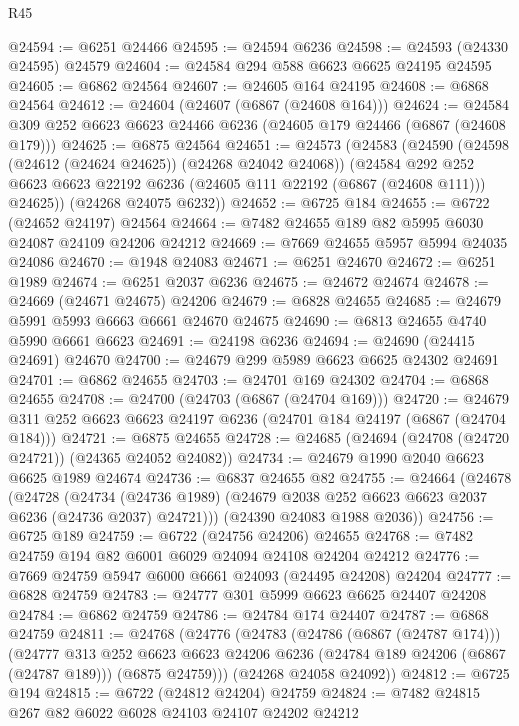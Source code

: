 \begin{lexlean}{R45}
\begin{coremodule}
{@24594 := @6251 @24466
@24595 := @24594 @6236
@24598 := @24593 (@24330 @24595) @24579
@24604 := @24584 @294 @588 @6623 @6625 @24195 @24595
@24605 := @6862 @24564
@24607 := @24605 @164 @24195
@24608 := @6868 @24564
@24612 := @24604 (@24607 (@6867 (@24608 @164)))
@24624 := @24584 @309 @252 @6623 @6623 @24466 @6236 (@24605 @179 @24466 (@6867 (@24608 @179)))
@24625 := @6875 @24564
@24651 := @24573
    (@24583
      (@24590
        (@24598 (@24612 (@24624 @24625)) (@24268 @24042 @24068))
        (@24584
          @292
          @252
          @6623
          @6623
          @22192
          @6236
          (@24605 @111 @22192 (@6867 (@24608 @111)))
          @24625))
      (@24268 @24075 @6232))
@24652 := @6725 @184
@24655 := @6722 (@24652 @24197) @24564
@24664 := @7482 @24655 @189 @82 @5995 @6030 @24087 @24109 @24206 @24212
@24669 := @7669 @24655 @5957 @5994 @24035 @24086
@24670 := @1948 @24083
@24671 := @6251 @24670
@24672 := @6251 @1989
@24674 := @6251 @2037 @6236
@24675 := @24672 @24674
@24678 := @24669 (@24671 @24675) @24206
@24679 := @6828 @24655
@24685 := @24679 @5991 @5993 @6663 @6661 @24670 @24675
@24690 := @6813 @24655 @4740 @5990 @6661 @6623
@24691 := @24198 @6236
@24694 := @24690 (@24415 @24691) @24670
@24700 := @24679 @299 @5989 @6623 @6625 @24302 @24691
@24701 := @6862 @24655
@24703 := @24701 @169 @24302
@24704 := @6868 @24655
@24708 := @24700 (@24703 (@6867 (@24704 @169)))
@24720 := @24679 @311 @252 @6623 @6623 @24197 @6236 (@24701 @184 @24197 (@6867 (@24704 @184)))
@24721 := @6875 @24655
@24728 := @24685 (@24694 (@24708 (@24720 @24721)) (@24365 @24052 @24082))
@24734 := @24679 @1990 @2040 @6623 @6625 @1989 @24674
@24736 := @6837 @24655 @82
@24755 := @24664
    (@24678
      (@24728
        (@24734 (@24736 @1989) (@24679 @2038 @252 @6623 @6623 @2037 @6236 (@24736 @2037) @24721)))
      (@24390 @24083 @1988 @2036))
@24756 := @6725 @189
@24759 := @6722 (@24756 @24206) @24655
@24768 := @7482 @24759 @194 @82 @6001 @6029 @24094 @24108 @24204 @24212
@24776 := @7669 @24759 @5947 @6000 @6661 @24093 (@24495 @24208) @24204
@24777 := @6828 @24759
@24783 := @24777 @301 @5999 @6623 @6625 @24407 @24208
@24784 := @6862 @24759
@24786 := @24784 @174 @24407
@24787 := @6868 @24759
@24811 := @24768
    (@24776
      (@24783
        (@24786 (@6867 (@24787 @174)))
        (@24777
          @313
          @252
          @6623
          @6623
          @24206
          @6236
          (@24784 @189 @24206 (@6867 (@24787 @189)))
          (@6875 @24759)))
      (@24268 @24058 @24092))
@24812 := @6725 @194
@24815 := @6722 (@24812 @24204) @24759
@24824 := @7482 @24815 @267 @82 @6022 @6028 @24103 @24107 @24202 @24212
}
\end{coremodule}
\end{lexlean}
